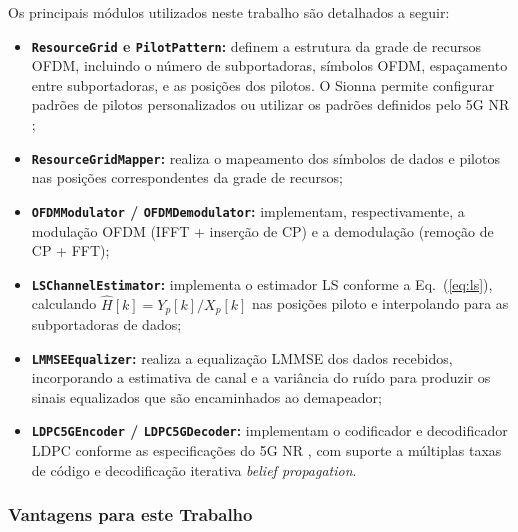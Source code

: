 \documentclass[conference]{IEEEtran}
\begin{document}
Os principais módulos utilizados neste trabalho são detalhados a seguir:

\begin{itemize}
    \item \textbf{\texttt{ResourceGrid} e \texttt{PilotPattern}:} definem a estrutura da grade de recursos OFDM, incluindo o número de subportadoras, símbolos OFDM, espaçamento entre subportadoras, e as posições dos pilotos. O Sionna permite configurar padrões de pilotos personalizados ou utilizar os padrões definidos pelo 5G NR \cite{sionna_doc};

    \item \textbf{\texttt{ResourceGridMapper}:} realiza o mapeamento dos símbolos de dados e pilotos nas posições correspondentes da grade de recursos;

    \item \textbf{\texttt{OFDMModulator} / \texttt{OFDMDemodulator}:} implementam, respectivamente, a modulação OFDM (IFFT + inserção de CP) e a demodulação (remoção de CP + FFT);

    \item \textbf{\texttt{LSChannelEstimator}:} implementa o estimador LS conforme a Eq.~(\ref{eq:ls}), calculando $\hat{H}[k] = Y_p[k]/X_p[k]$ nas posições piloto e interpolando para as subportadoras de dados;

    \item \textbf{\texttt{LMMSEEqualizer}:} realiza a equalização LMMSE dos dados recebidos, incorporando a estimativa de canal e a variância do ruído para produzir os sinais equalizados que são encaminhados ao demapeador;

    \item \textbf{\texttt{LDPC5GEncoder} / \texttt{LDPC5GDecoder}:} implementam o codificador e decodificador LDPC conforme as especificações do 5G NR \cite{3gpp38211, richardson2008}, com suporte a múltiplas taxas de código e decodificação iterativa \textit{belief propagation}.
\end{itemize}

\subsubsection{Vantagens para este Trabalho}
\end{document}

